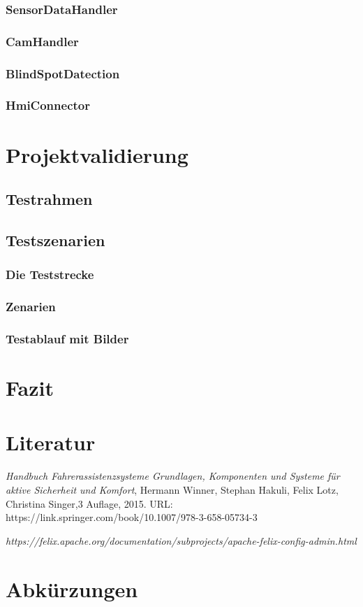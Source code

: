\documentclass[15pt]{scrartcl}
\begin{document}
\subsubsection{SensorDataHandler}
\subsubsection{CamHandler}
\subsubsection{BlindSpotDatection}
\subsubsection{HmiConnector}

\newpage
\section{Projektvalidierung}
\subsection{Testrahmen}
\subsection{Testszenarien}
\subsubsection{Die Teststrecke}
\subsubsection{Zenarien}
\subsubsection{Testablauf mit Bilder}

\newpage
\section{Fazit}
\section{Literatur}
\thispagestyle{empty}

\begin{thebibliography}{9}
 \emph{
Handbuch Fahrerassistenzsysteme
Grundlagen, Komponenten und Systeme für aktive Sicherheit und Komfort},
Hermann Winner, Stephan Hakuli, Felix Lotz, Christina Singer,3 Auflage, 2015. URL: https://link.springer.com/book/10.1007/978-3-658-05734-3
 
\emph{https://felix.apache.org/documentation/subprojects/apache-felix-config-admin.html}
\end{thebibliography}

\section{Abkürzungen}
\end{document}
